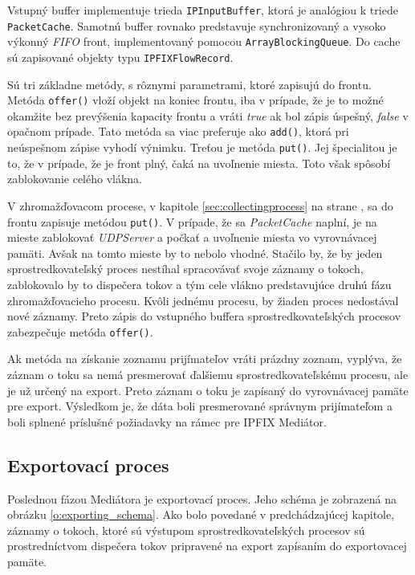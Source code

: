 Vstupný  buffer implementuje trieda \verb|IPInputBuffer|, ktorá je analógiou k triede \verb|PacketCache|.
Samotnú buffer rovnako predstavuje synchronizovaný a vysoko výkonný \emph{FIFO} front, implementovaný 
pomocou \verb|ArrayBlockingQueue|. Do cache sú zapisované objekty typu \verb|IPFIXFlowRecord|.

Sú tri základne metódy, s rôznymi parametrami, ktoré zapisujú do frontu.
Metóda \verb|offer()| vloží objekt na koniec frontu, iba v prípade, že je to možné 
okamžite bez prevýšenia kapacity frontu a vráti \emph{true} ak bol zápis úspešný, \emph{false} v 
opačnom prípade. Tato metóda sa viac preferuje ako \verb|add()|, ktorá pri neúspešnom zápise 
vyhodí výnimku. Treťou je metóda \verb|put()|. Jej špecialitou je to, že v prípade, že je front plný,
čaká na uvoľnenie miesta. Toto však spôsobí zablokovanie celého vlákna. \citep{arrayblockingqueue}

V zhromažďovacom procese, v kapitole \ref{sec:collectingprocess} na strane \pageref{sec:collectingprocess},
sa do frontu zapisuje metódou \verb|put()|. V prípade, že sa \emph{PacketCache} naplní, je na mieste 
zablokovať \emph{UDPServer} a počkať a uvoľnenie miesta vo vyrovnávacej pamäti. Avšak na tomto mieste by 
to nebolo vhodné. Stačilo by, že by jeden sprostredkovateľský proces nestíhal spracovávať svoje záznamy
o tokoch, zablokovalo by to dispečera tokov a tým cele vlákno predstavujúce druhú fázu zhromažďovacieho
procesu. Kvôli jednému procesu, by žiaden proces nedostával nové záznamy. Preto zápis do vstupného buffera
sprostredkovateľských procesov zabezpečuje metóda \verb|offer()|.

Ak metóda na získanie zoznamu prijímateľov vráti prázdny zoznam, vyplýva, že záznam o toku 
sa nemá presmerovať ďalšiemu sprostredkovateľskému procesu, ale je už určený na export. Preto záznam o 
toku je zapísaný do vyrovnávacej pamäte pre export. Výsledkom je, že dáta boli presmerované správnym 
prijímateľom a boli splnené príslušné požiadavky na rámec pre IPFIX Mediátor.

\subsection{Exportovací proces}

Poslednou fázou Mediátora je exportovací proces. Jeho schéma je zobrazená na obrázku 
\ref{o:exporting_schema}. Ako bolo povedané v predchádzajúcej kapitole, záznamy 
o tokoch, ktoré sú výstupom  sprostredkovateľských procesov sú prostredníctvom dispečera 
tokov pripravené na export zapísaním do exportovacej pamäte.


